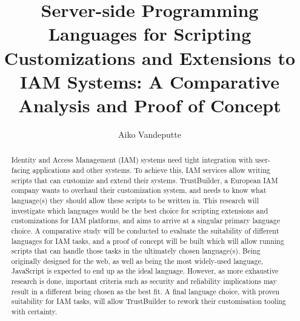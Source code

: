 \documentclass[english]{hogent-article}
\title{Server-side Programming Languages for Scripting Customizations and Extensions to IAM Systems: A Comparative Analysis and Proof of Concept}
\author{Aiko Vandeputte}
\begin{document}
\begin{abstract}
  Identity and Access Management (IAM) systems need tight integration with user-facing applications and other systems. To achieve this, IAM services allow writing scripts that can customize and extend their systems. TrustBuilder, a European IAM company wants to overhaul their customization system, and needs to know what language(s) they should allow these scripts to be written in. This research will investigate which languages would be the best choice for scripting extensions and customizations for IAM platforms, and aims to arrive at a singular primary language choice. A comparative study will be conducted to evaluate the suitability of different languages for IAM tasks, and a proof of concept will be built which will allow running scripts that can handle those tasks in the ultimately chosen language(s). Being originally designed for the web, as well as being the most widely-used language, JavaScript is expected to end up as the ideal language. However, as more exhaustive research is done, important criteria such as security and reliability implications may result in a different being chosen as the best fit. A final language choice, with proven suitability for IAM tasks, will allow TrustBuilder to rework their customisation tooling with certainty.
\end{abstract}

\tableofcontents



\printbibliography[heading=bibintoc]
\end{document}
